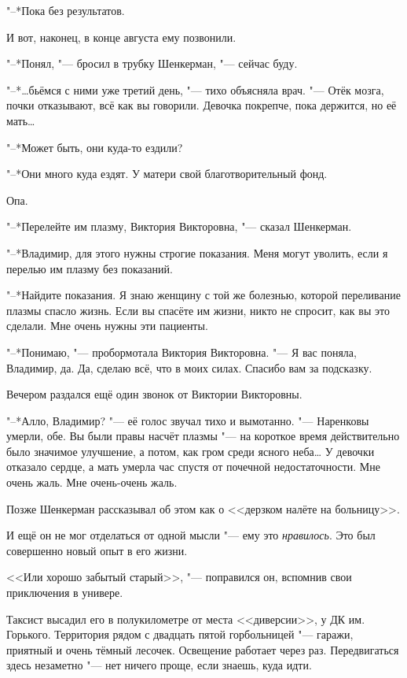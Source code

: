 "--*Пока без результатов.

И вот, наконец, в конце августа ему позвонили.

\label{Fri_2012_08_24}

"--*Понял, "--- бросил в трубку Шенкерман, "--- сейчас буду.

"--*\ldots{}бьёмся с ними уже третий день, "--- тихо объясняла врач.
"--- Отёк мозга, почки отказывают, всё как вы говорили.
Девочка покрепче, пока держится, но её мать\ldots{}

"--*Может быть, они куда-то ездили?

"--*Они много куда ездят.
У матери свой благотворительный фонд.

Опа.

"--*Перелейте им плазму, Виктория Викторовна, "--- сказал Шенкерман.

"--*Владимир, для этого нужны строгие показания.
Меня могут уволить, если я перелью им плазму без показаний.

"--*Найдите показания.
Я знаю женщину с той же болезнью, которой переливание плазмы спасло жизнь.
Если вы спасёте им жизни, никто не спросит, как вы это сделали.
Мне очень нужны эти пациенты.

"--*Понимаю, "--- пробормотала Виктория Викторовна.
"--- Я вас поняла, Владимир, да.
Да, сделаю всё, что в моих силах.
Спасибо вам за подсказку.

Вечером раздался ещё один звонок от Виктории Викторовны.

"--*Алло, Владимир? "--- её голос звучал тихо и вымотанно.
"--- Наренковы умерли, обе.
Вы были правы насчёт плазмы "--- на короткое время действительно было значимое улучшение, а потом, как гром среди ясного неба\ldots{}
У девочки отказало сердце, а мать умерла час спустя от почечной недостаточности.
Мне очень жаль.
Мне очень-очень жаль.

\asterism

\textspace

Позже Шенкерман рассказывал об этом как о <<дерзком налёте на больницу>>.

\textspace

И ещё он не мог отделаться от одной мысли "--- ему это \emph{нравилось}.
Это был совершенно новый опыт в его жизни.

<<Или хорошо забытый старый>>, "--- поправился он, вспомнив свои приключения в универе.

Таксист высадил его в полукилометре от места <<диверсии>>, у ДК им. Горького.
Территория рядом с двадцать пятой горбольницей "--- гаражи, приятный и очень тёмный лесочек.
Освещение работает через раз.
Передвигаться здесь незаметно "--- нет ничего проще, если знаешь, куда идти.

